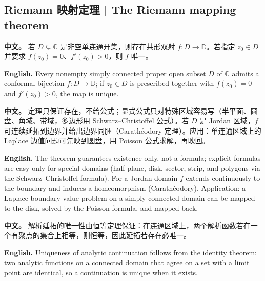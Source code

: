 \documentclass[UTF8,11pt,a4paper]{ctexart}
\newcommand{\APS}[2]{\par\noindent\textbf{中文。} #1\par\noindent\textbf{English.} #2\par\smallskip}
\begin{document}
\subsection{Riemann 映射定理 | The Riemann mapping theorem}
\APS{若 $D\subsetneq\mathbb C$ 是非空单连通开集，则存在共形双射 $f:D\to\mathbb D$。若指定 $z_0\in D$ 并要求 $f(z_0)=0$、$f'(z_0)>0$，则 $f$ 唯一。}{Every nonempty simply connected proper open subset $D$ of $\mathbb C$ admits a conformal bijection $f:D\to\mathbb D$; if $z_0\in D$ is prescribed together with $f(z_0)=0$ and $f'(z_0)>0$, the map is unique.}
\APS{定理只保证存在，不给公式；显式公式只对特殊区域容易写（半平面、圆盘、角域、带域，多边形用 Schwarz--Christoffel 公式）。若 $D$ 是 Jordan 区域，$f$ 可连续延拓到边界并给出边界同胚（Carathéodory 定理）。应用：单连通区域上的 Laplace 边值问题可先映到圆盘，用 Poisson 公式求解，再映回。}{The theorem guarantees existence only, not a formula; explicit formulas are easy only for special domains (half-plane, disk, sector, strip, and polygons via the Schwarz--Christoffel formula). For a Jordan domain $f$ extends continuously to the boundary and induces a homeomorphism (Carathéodory). Application: a Laplace boundary-value problem on a simply connected domain can be mapped to the disk, solved by the Poisson formula, and mapped back.}
\APS{解析延拓的唯一性由恒等定理保证：在连通区域上，两个解析函数若在一个有聚点的集合上相等，则恒等，因此延拓若存在必唯一。}{Uniqueness of analytic continuation follows from the identity theorem: two analytic functions on a connected domain that agree on a set with a limit point are identical, so a continuation is unique when it exists.}
\end{document}

